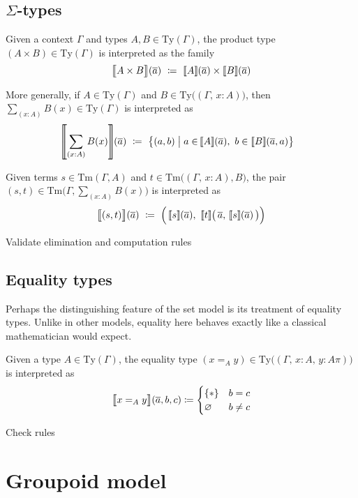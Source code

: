 \documentclass{article}
\theoremstyle{definition}
\renewcommand{\int}[1]
    {\left\llbracket #1 \right\rrbracket}       %
\newcommand{\Sig}[2]{\sum_{#1} #2}             %
\newcommand{\Ty}{\mathrm{Ty}}
\newcommand{\Tm}{\mathrm{Tm}}
\newcommand{\defeq}{
	\mathrel{\mathrel{\mathop:}\mkern-1.2mu=}}	%
\newcommand{\tup}[1]{\overline{#1}}
\newcommand{\n}{\hspace{-0.2em}}                %
\begin{document}
\subsection{\texorpdfstring{$\Sigma$}{Sigma}-types}

Given a context $\Gamma$ and types $A, B \in \Ty(\Gamma)$, the product type $(A \times B) \in \Ty(\Gamma)$ is interpreted as the family
$$\int{\big.A \times B}\n(\tup{a})\ \defeq\ \int{A}\n(\tup{a}) \times \int{B}\n(\tup{a})$$

More generally, if $A \in \Ty(\Gamma)$ and $B \in \Ty \big( (\Gamma,\, x:A) \big)$, then $\Sig{(x:A)}{B(x)}\in \Ty(\Gamma)$ is interpreted as
\begin{align*}
    \int{\Sig{(x:A)}{B(x)}}\hspace{-0.35em}(\tup{a})\ \defeq\ \big\{ (a,b) \mathrel{\big|} a \in &\int{A}\n(\tup{a}),\ b \in \int{B}\n(\tup{a},a) \big\}
\end{align*}

Given terms $s \in \Tm(\Gamma, A)$ and $t \in \Tm \big( (\Gamma,\, x:A), B \big)$, the pair $(s,t) \in \Tm\Big( \Gamma, \Sig{(x:A)}{B(x)} \Big)$ is interpreted as
$$\int{\big.(s,t)}\n(\tup{a})\ \defeq\ \Big( \int{s}\n(\tup{a}),\ \int{t}\n\big(\, \tup{a},\,\int{s}\n(\tup{a}) \,\big) \Big)$$

{\color{red} Validate elimination and computation rules}


\subsection{Equality types}

Perhaps the distinguishing feature of the set model is its treatment of equality types. Unlike in other models, equality here behaves exactly like a classical mathematician would expect.

Given a type $A \in \Ty(\Gamma)$, the equality type $(x =_A y) \in \Ty\big((\Gamma,\, x:A,\, y:A\pi)\big)$ is interpreted as
$$\int{\big.x =_A y}\n(\tup{a},b,c) \defeq \begin{cases}
    \{ * \} & b=c \\
    \varnothing & b \neq c
\end{cases}$$

{\color{red} Check rules}


\section{Groupoid model}
\end{document}
